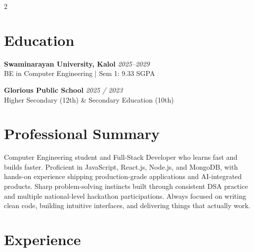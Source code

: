 \documentclass[letterpaper,10pt]{article}
\begin{document}
\begin{paracol}{2}
\switchcolumn

\section{Education}

\noindent\textbf{Swaminarayan University, Kalol} \hfill \textit{2025--2029} \\
\small BE in Computer Engineering \enspace | \enspace Sem 1: 9.33 SGPA \par

\vspace{4pt}
\noindent\textbf{Glorious Public School} \hfill \textit{2025 / 2023} \\
\small Higher Secondary (12th) \enspace \& \enspace Secondary Education (10th) \par

\vspace{6pt}

\section{Professional Summary}

\small Computer Engineering student and Full-Stack Developer who learns fast and builds faster. Proficient in JavaScript, React.js, Node.js, and MongoDB, with hands-on experience shipping production-grade applications and AI-integrated products. Sharp problem-solving instincts built through consistent DSA practice and multiple national-level hackathon participations. Always focused on writing clean code, building intuitive interfaces, and delivering things that actually work. \par

\vspace{6pt}

\section{Experience}


\end{paracol}
\end{document}
